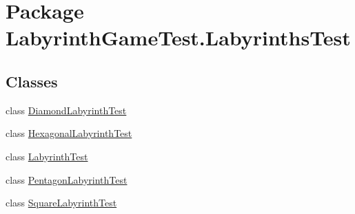 \hypertarget{namespace_labyrinth_game_test_1_1_labyrinths_test}{\section{Package Labyrinth\+Game\+Test.\+Labyrinths\+Test}
\label{namespace_labyrinth_game_test_1_1_labyrinths_test}
}
\subsection*{Classes}
\begin{DoxyCompactItemize}
\item 
class \hyperlink{class_labyrinth_game_test_1_1_labyrinths_test_1_1_diamond_labyrinth_test}{Diamond\+Labyrinth\+Test}
\item 
class \hyperlink{class_labyrinth_game_test_1_1_labyrinths_test_1_1_hexagonal_labyrinth_test}{Hexagonal\+Labyrinth\+Test}
\item 
class \hyperlink{class_labyrinth_game_test_1_1_labyrinths_test_1_1_labyrinth_test}{Labyrinth\+Test}
\item 
class \hyperlink{class_labyrinth_game_test_1_1_labyrinths_test_1_1_pentagon_labyrinth_test}{Pentagon\+Labyrinth\+Test}
\item 
class \hyperlink{class_labyrinth_game_test_1_1_labyrinths_test_1_1_square_labyrinth_test}{Square\+Labyrinth\+Test}
\end{DoxyCompactItemize}
